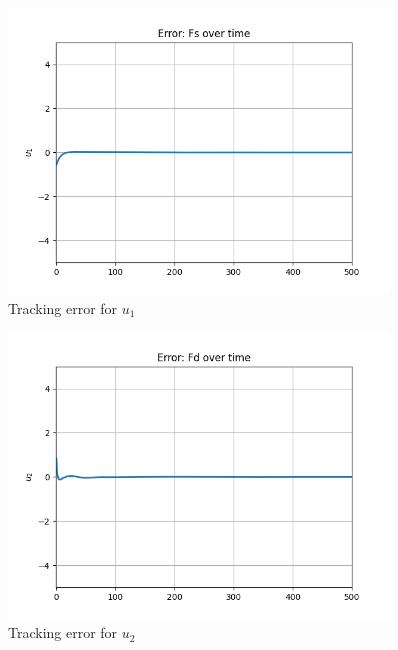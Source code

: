 \begin{figure}[H]
\centering
\includegraphics[width=0.9\textwidth]{pictures/mpc19.png}
\caption{Tracking error for $u_1$}
\label{fig:mpc19}
\end{figure}

\begin{figure}[H]
\centering
\includegraphics[width=0.9\textwidth]{pictures/mpc20.png}
\caption{Tracking error for $u_2$}
\label{fig:mpc20}
\end{figure}
